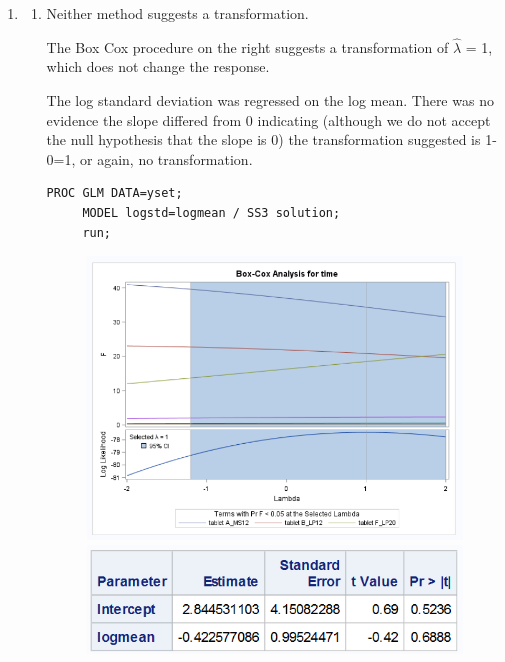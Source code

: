 \documentclass{article}\usepackage[]{graphicx}\usepackage[]{color}
\begin{document}
\begin{enumerate}

\item

\begin{enumerate} %
\item

Neither method suggests a transformation.

The Box Cox procedure on the right suggests a transformation of $\hat{\lambda}$ = 1, which does not change the response.

The log standard deviation was regressed on the log mean. There was no evidence the slope differed from 0 indicating (although we do not accept the null hypothesis that the slope is 0) the transformation suggested is 1-0=1, or again, no transformation.

\begin{verbatim}
PROC GLM DATA=yset;
     MODEL logstd=logmean / SS3 solution;
	 run;
\end{verbatim}

\begin{figure}[h!]
\centering
\begin{minipage}{.5\textwidth}
  \centering
  \includegraphics[width=1\linewidth]{prob1a}
  \end{minipage}%
\begin{minipage}{.5\textwidth}
  \centering
  \includegraphics[width=1\linewidth]{prob1a1}
\end{minipage}
\end{figure}
\FloatBarrier



\end{enumerate}
\end{enumerate}
\end{document}
